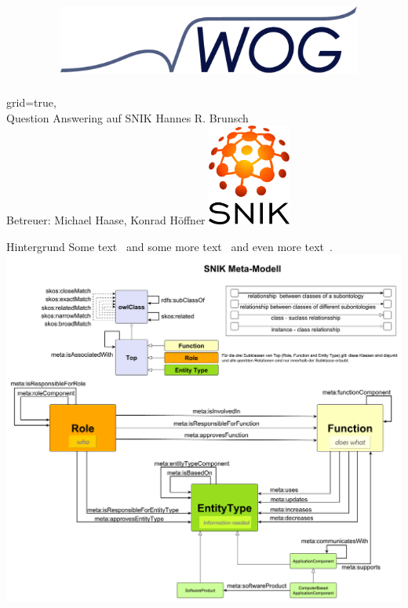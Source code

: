 \documentclass[portrait,final,a0paper,fontscale=0.320]{imiseposter}
\begin{document}
\begin{poster}%
  {grid=true,}
  {\includegraphics[height=4.5cm, width=10cm, keepaspectratio]{img/logos/wog-logo-ohne-text.pdf}} 
  {Question Answering auf SNIK}
  {Hannes R. Brunsch\\
  Betreuer: Michael Haase, Konrad H{\"o}ffner}
  {\includegraphics[height=9.0em]{img/logos/snik-logo.png}}

\begin{posterbox}[name=background,column=0,row=0]{Hintergrund}
Some text~\cite{bb} and some more text~\cite{ob} and even more text~\cite{he}.
\includegraphics[width=\linewidth]{../Dokumentation/Images/snik-metamodel.pdf}


\end{posterbox}
\end{poster}
\end{document}
